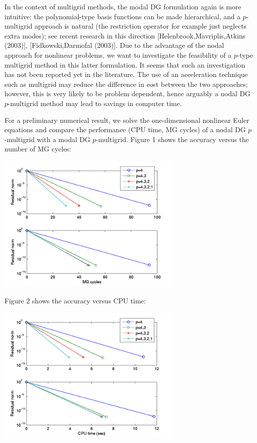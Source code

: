 \documentclass[twosided]{report}
\begin{document}
In the context of multigrid methods, the modal DG formulation again is
more intuitive: the polynomial-type basis functions can be made
hierarchical, and a $p$-multigrid approach is natural (the restriction
operator for example just neglects extra modes); see recent research in
this direction [Helenbrook,Mavriplis,Atkins (2003)],
[Fidkowski,Darmofal (2003)]. Due to the advantage of the nodal approach
for nonlinear problems, we want to investigate the feasibility of a
$p$-type multigrid method in this latter formulation. It seems that such
an investigation has not been reported yet in the literature. The use
of an acceleration technique such as multigrid may reduce the
difference in cost between the two approaches; however, this is very
likely to be problem dependent, hence arguably a nodal DG $p$-multigrid
method may lead to savings in computer time.

For a preliminary numerical result, we solve the one-dimensional
nonlinear Euler equations and compare the performance (CPU time, MG
cycles) of a nodal DG $p$-multigrid with a modal DG $p$-multigrid.
Figure 1 shows the accuracy versus the number of MG cycles:
\begin{center}
\includegraphics[width=90mm]{KimDfig1}
\end{center}

Figure 2 shows the accuracy versus CPU time:
\begin{center}
\includegraphics[width=90mm]{KimDfig2}
\end{center}
\end{document}
